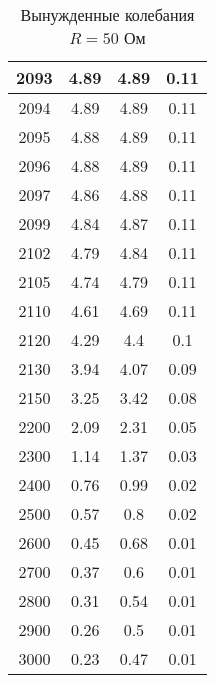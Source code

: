 \documentclass[a4paper, usenames, dvipsnames]{article}
\begin{document}
\begin{table}[p]
\begin{tabular}{|c|c|c|c|}
        \hline
        2093       & 4.89     & 4.89     & 0.11     \\
        \hline
        2094       & 4.89     & 4.89     & 0.11     \\
        \hline
        2095       & 4.88     & 4.89     & 0.11     \\
        \hline
        2096       & 4.88     & 4.89     & 0.11     \\
        \hline
        2097       & 4.86     & 4.88     & 0.11     \\
        \hline
        2099       & 4.84     & 4.87     & 0.11     \\
        \hline
        2102       & 4.79     & 4.84     & 0.11     \\
        \hline
        2105       & 4.74     & 4.79     & 0.11     \\
        \hline
        2110       & 4.61     & 4.69     & 0.11     \\
        \hline
        2120       & 4.29     & 4.4      & 0.1      \\
        \hline
        2130       & 3.94     & 4.07     & 0.09     \\
        \hline
        2150       & 3.25     & 3.42     & 0.08     \\
        \hline
        2200       & 2.09     & 2.31     & 0.05     \\
        \hline
        2300       & 1.14     & 1.37     & 0.03     \\
        \hline
        2400       & 0.76     & 0.99     & 0.02     \\
        \hline
        2500       & 0.57     & 0.8      & 0.02     \\
        \hline
        2600       & 0.45     & 0.68     & 0.01     \\
        \hline
        2700       & 0.37     & 0.6      & 0.01     \\
        \hline
        2800       & 0.31     & 0.54     & 0.01     \\
        \hline
        2900       & 0.26     & 0.5      & 0.01     \\
        \hline
        3000       & 0.23     & 0.47     & 0.01     \\
        \hline
    \end{tabular}
    \caption{Вынужденные колебания $R = 50$ Ом}
\end{table}
\end{document}
